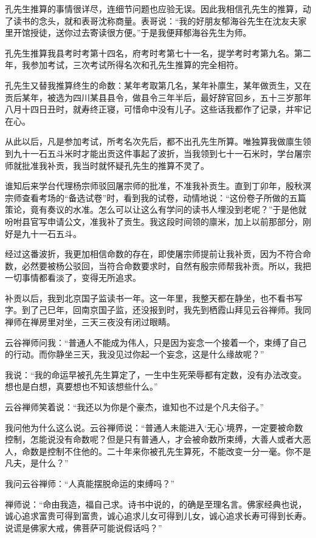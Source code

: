 \documentclass[12pt,UTF8]{ctexbook}
\begin{document}
孔先生推算的事情很详尽，连细节问题也应验无误。因此我相信孔先生的推算，动了读书的念头，就和表哥沈称商量。表哥说：“我的好朋友郁海谷先生在沈友夫家里开馆授徒，送你过去寄读很方便。”于是我便拜郁海谷先生为师。

孔先生推算我县考时考第十四名，府考时考第七十一名，提学考时考第九名。第二年，我参加考试，三次考试所得名次和孔先生推算的完全相符。

孔先生又替我推算终生的命数：某年考取第几名，某年补廪生，某年做贡生，又在贡后某年，被选为四川某县县令，做县令三年半后，最好辞官回乡，五十三岁那年八月十四日丑时，就寿终正寝，可惜命中没有儿子。这些话我都作了记录，并牢记在心。

从此以后，凡是参加考试，所考名次先后，都不出孔先生所算。唯独算我做廪生领到九十一石五斗米时才能出贡这件事起了波折，当我领到七十一石米时，学台屠宗师就批准我补贡，我当时就怀疑孔先生的推算不灵了。

谁知后来学台代理杨宗师驳回屠宗师的批准，不准我补贡生。直到丁卯年，殷秋溟宗师查看考场的“备选试卷”时，看到我的试卷，动情地说：“这份卷子所做的五篇策论，竟有奏议的水准。怎么可以让这么有学问的读书人埋没到老呢？”于是他就吩咐县官写申请公文，准我补了贡生。我这段时间领的廪米，加上以前那部分，刚好是九十一石五斗。

经过这番波折，我更加相信命数的存在，即使屠宗师提前让我补贡，因为不符合命数，必然要被杨公驳回，当符合命数要求时，自然有殷宗师帮我补贡。所以，我把一切事情都看淡了，变得无所追求。

补贡以后，我到北京国子监读书一年。这一年里，我整天都在静坐，也不看书写字。到了己巳年，回南京国子监，还没报到时，我先到栖霞山拜见云谷禅师。我同禅师在禅房里对坐，三天三夜没有闭过眼睛。

云谷禅师问我：“普通人不能成为伟人，只是因为妄念一个接着一个，束缚了自己的行动。而你静坐三天，我没见过你起一个妄念，这是什么缘故呢？”

我说：“我的命运早被孔先生算定了，一生中生死荣辱都有定数，没有办法改变。想也是白想，真要想也不知该想些什么。”

云谷禅师笑着说：“我还以为你是个豪杰，谁知也不过是个凡夫俗子。”

我问他为什么这么说。云谷禅师说：“普通人未能进入‘无心’境界，一定要被命数控制，怎能说没有命数呢？但是只有普通人，才会被命数所束缚，大善人或者大恶人，命数是控制不住他的。二十年来你被孔先生算死，不能改变一分一毫。你不是凡夫，是什么？”

我问云谷禅师：“人真能摆脱命运的束缚吗？”

禅师说：“命由我造，福自己求。诗书中说的，的确是至理名言。佛家经典也说，诚心追求富贵可得到富贵，诚心追求儿女可得到儿女，诚心追求长寿可得到长寿。说谎是佛家大戒，佛菩萨可能说假话吗？”
\end{document}
